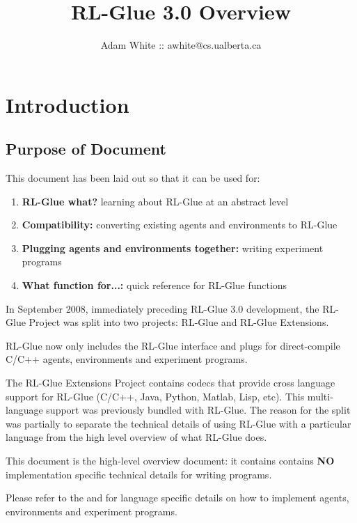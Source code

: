 \documentclass[11pt]{article}
\title{RL-Glue 3.0 Overview}
\author{Adam White :: awhite@cs.ualberta.ca}
\date{}
\begin{document}
\maketitle
\tableofcontents


\section{Introduction}
\subsection{Purpose of Document}
This document has been laid out so that it can be used for: 
\begin{enumerate}
\item  {\bf RL-Glue what?} learning about RL-Glue at an abstract level
\item {\bf Compatibility:} converting existing agents and environments to RL-Glue
\item {\bf Plugging agents and environments together:} writing experiment programs
\item{\bf What function for...:} quick reference for RL-Glue functions
\end{enumerate}

In September 2008, immediately preceding RL-Glue 3.0 development, the RL-Glue Project was split into two projects: RL-Glue and RL-Glue Extensions.

RL-Glue now only includes the RL-Glue interface and plugs for direct-compile C/C++ agents, environments and experiment programs.

The RL-Glue Extensions Project contains codecs that provide cross language support for RL-Glue (C/C++, Java, Python, Matlab, Lisp, etc).  This multi-language support was previously bundled with RL-Glue.  The reason for the split was partially to separate the technical details of using RL-Glue with a particular language from the high level overview of what RL-Glue does.

This document is the high-level overview document: it contains contains {\bf NO} implementation specific technical details for writing programs.

Please refer to the  and  for language specific details on how to implement agents, environments and experiment programs.
 
\end{document}
